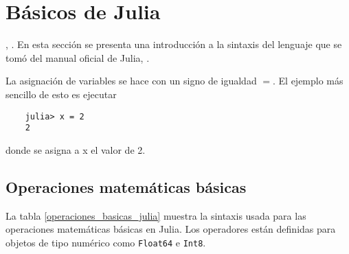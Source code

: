 \section{Básicos de Julia}
, \cite{manual_Julia}. En esta sección se presenta una introducción a la sintaxis del lenguaje que se tomó del manual oficial de \textsf{Julia}, \cite{manual_Julia}. 

La asignación de variables se hace con un signo de igualdad $=$. El ejemplo más sencillo de esto es ejecutar 
\begin{verbatim}
	julia> x = 2
	2
\end{verbatim}

\noindent donde se asigna a x el valor de 2. 

\subsection{Operaciones matemáticas básicas}
La tabla \ref{operaciones_basicas_julia} muestra la sintaxis usada para las operaciones matemáticas básicas en \textsf{Julia}. Los operadores están definidas para objetos de tipo numérico como \texttt{Float64} e \texttt{Int8}. 

